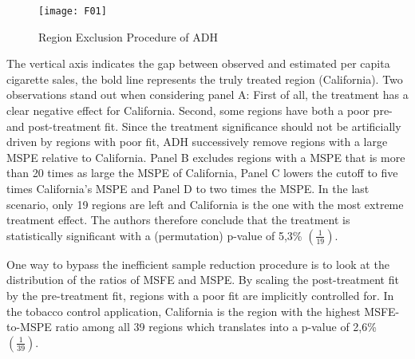 \begin{figure}[H]
	\centering
	\texttt{[image: F01]}
	\caption{Region Exclusion Procedure of ADH}
	\label{F_01}
\end{figure}

The vertical axis indicates the gap between observed and estimated  per capita cigarette sales, the bold line represents the truly treated region (California). Two observations stand out when considering panel A: First of all, the treatment has a clear negative effect for California. Second, some regions have both a poor pre- and post-treatment fit. Since the treatment significance should not be artificially driven by regions with poor fit, \ac{ADH} successively remove regions with a large \ac{MSPE} relative to California. Panel B excludes regions with a \ac{MSPE} that is more than 20 times as large the \ac{MSPE} of California, Panel C lowers the cutoff to five times California's \ac{MSPE} and Panel D to  two times the \ac{MSPE}. In the last scenario, only 19 regions are left and California is the one with the most extreme treatment effect. The authors therefore conclude that the treatment is statistically significant with a (permutation) p-value of 5,3\% $\left(  \frac{1}{19} \right) $. 

One way to bypass the inefficient sample reduction procedure is to look at the distribution of the ratios of \ac{MSFE} and \ac{MSPE}. By scaling the post-treatment fit by the pre-treatment fit, regions with a poor fit are implicitly controlled for. In the tobacco control application, California is the region with the highest \ac{MSFE}-to-\ac{MSPE} ratio among all 39 regions which translates into a p-value of 2,6\% $\left(  \frac{1}{39} \right) $. 

